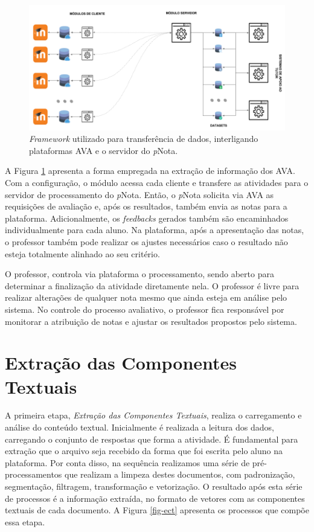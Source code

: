 \begin{figure}[!h]
\centering
\includegraphics[width=\textwidth]{figuras/framework-moodle.png}
\caption{\textit{Framework} utilizado para transferência de dados, interligando plataformas AVA e o servidor do \textit{p}Nota.}
\label{fig-framework}
\end{figure}

A Figura \ref{fig-framework} apresenta a forma empregada na extração de informação dos AVA. Com a configuração, o módulo acessa cada cliente e transfere as atividades para o servidor de processamento do \textit{p}Nota. Então, o \textit{p}Nota solicita via AVA as requisições de avaliação e, após os resultados, também envia as notas para a plataforma. Adicionalmente, os \textit{feedbacks} gerados também são encaminhados individualmente para cada aluno. Na plataforma, após a apresentação das notas, o professor também pode realizar os ajustes necessários caso o resultado não esteja totalmente alinhado ao seu critério.

O professor, controla via plataforma o processamento, sendo aberto para determinar a finalização da atividade diretamente nela. O professor é livre para realizar alterações de qualquer nota mesmo que ainda esteja em análise pelo sistema. No controle do processo avaliativo, o professor fica responsável por monitorar a atribuição de notas e ajustar os resultados propostos pelo sistema.


\section{Extração das Componentes Textuais}
\label{sec-componentes-textuais}

A primeira etapa, \textit{Extração das Componentes Textuais}, realiza o carregamento e análise do conteúdo textual. Inicialmente é realizada a leitura dos dados, carregando o conjunto de respostas que forma a atividade. É fundamental para extração que o arquivo seja recebido da forma que foi escrita pelo aluno na plataforma. Por conta disso, na sequência realizamos uma série de pré-processamentos que realizam a limpeza destes documentos, com padronização, segmentação, filtragem, transformação e vetorização. O resultado após esta série de processos é a informação extraída, no formato de vetores com as componentes textuais de cada documento. A Figura \ref{fig-ect} apresenta os processos que compõe essa etapa.

